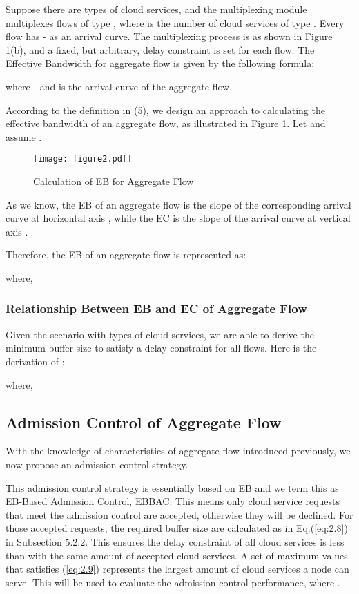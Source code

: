 \documentclass[a4paper]{article}
\begin{document}
Suppose there are  types of cloud services, and the multiplexing module multiplexes  flows of type , where  is the number of cloud services of type . Every flow has - as an arrival curve. The multiplexing process is as shown in Figure 1(b), and a fixed, but arbitrary, delay constraint  is set for each flow. The Effective Bandwidth for aggregate flow is given by the following formula:



where - and  is the arrival curve of the aggregate flow.

According to the definition in (5), we design an approach to calculating the effective bandwidth of an aggregate flow, as illustrated in Figure \ref{fig2}. Let  and assume .

\begin{figure}[h]
    \centering
    \texttt{[image: figure2.pdf]}
    \caption{Calculation of EB for Aggregate Flow}
    \label{fig2}
\end{figure}

As we know, the EB of an aggregate flow is the slope of the corresponding arrival curve at horizontal axis , while the EC is the slope of the arrival curve at vertical axis .

Therefore, the EB of an aggregate flow is represented as:



where,




\subsubsection{Relationship Between EB and EC of Aggregate Flow}

Given the scenario with  types of cloud services, we are able to derive the minimum buffer size  to satisfy a delay constraint  for all flows. Here is the derivation of :





where, 

\subsection{Admission Control of Aggregate Flow}

With the knowledge of characteristics of aggregate flow introduced previously, we now propose an admission control strategy.



This admission control strategy is essentially based on EB and we term this as EB-Based Admission Control, EBBAC. This means only cloud service requests that meet the admission control are accepted, otherwise they will be declined. For those accepted requests, the required buffer size are calculated as in Eq.(\ref{eq:2.8}) in Subsection 5.2.2. This ensures the delay constraint of all cloud services is less than  with the same amount of accepted cloud services. A set of maximum values  that satisfies (\ref{eq:2.9}) represents the largest amount of cloud services a node can serve. This will be used to evaluate the admission control performance, where .
\end{document}
